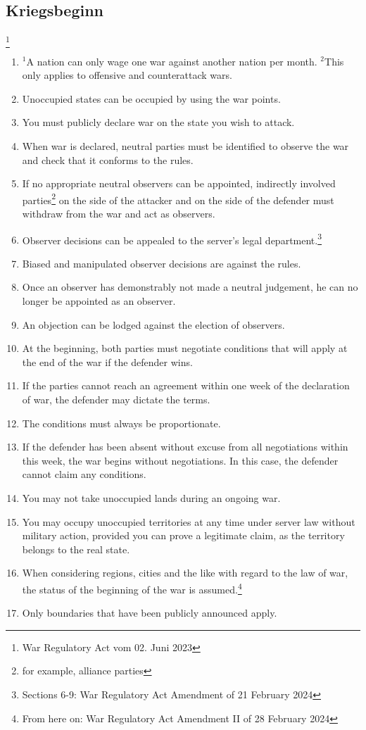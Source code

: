 \documentclass{article}
\newcommand{\sent}[1]{$^{#1}$}
\begin{document}
\subsection{Kriegsbeginn}\footnote{War Regulatory Act vom 02. Juni 2023}
\begin{enumerate}[(1)]
	\item \sent{1}A nation can only wage one war against another nation per month. \sent{2}This only applies to offensive and counterattack wars.
	\item Unoccupied states can be occupied by using the war points.
	\item You must publicly declare war on the state you wish to attack. %
	\item When war is declared, neutral parties must be identified to observe the war and check that it conforms to the rules.
	\item If no appropriate neutral observers can be appointed, indirectly involved parties\footnote{for example, alliance parties} on the side of the attacker and on the side of the defender must withdraw from the war and act as observers.
	\item Observer decisions can be appealed to the server's legal department.\footnote{Sections 6-9: War Regulatory Act Amendment of 21 February 2024}
	\item Biased and manipulated observer decisions are against the rules.
	\item Once an observer has demonstrably not made a neutral judgement, he can no longer be appointed as an observer.
	\item An objection can be lodged against the election of observers.
	\item At the beginning, both parties must negotiate conditions that will apply at the end of the war if the defender wins. %
	\item If the parties cannot reach an agreement within one week of the declaration of war, the defender may dictate the terms.
	\item The conditions must always be proportionate.
	\item If the defender has been absent without excuse from all negotiations within this week, the war begins without negotiations. In this case, the defender cannot claim any conditions.
	\item You may not take unoccupied lands during an ongoing war.
	\item You may occupy unoccupied territories at any time under server law without military action, provided you can prove a legitimate claim, as the territory belongs to the real state.
	\item When considering regions, cities and the like with regard to the law of war, the status of the beginning of the war is assumed.\footnote{From here on: War Regulatory Act Amendment II of 28 February 2024}
	\item Only boundaries that have been publicly announced apply.
\end{enumerate}
\end{document}

